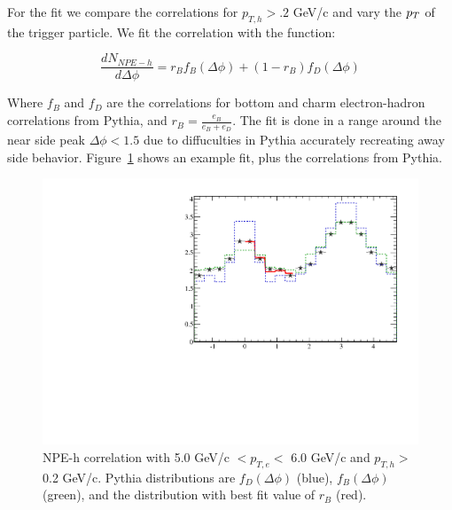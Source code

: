 For the fit we compare the correlations for $p_{T,h} > .2$ GeV/c and vary the $p_{T}$ of the trigger particle. We fit the correlation with the function:

\begin{equation}\label{eq:BDfitfunc}
\frac{dN_{NPE-h}}{d\Delta\phi} = r_B f_B(\Delta\phi) + (1 - r_B) f_D(\Delta\phi)
\end{equation}

Where $f_B$ and $f_D$ are the correlations for bottom and charm electron-hadron correlations from Pythia, and $r_B = \frac{e_B}{e_B + e_D}$. The fit is done in a range around the near side peak $\Delta\phi < 1.5$ due to diffuculties in Pythia accurately recreating away side behavior. Figure~\ref{fig:exfit} shows an example fit, plus the correlations from Pythia.

\begin{figure}[htbp]
\begin{center}
\includegraphics[scale=.8]{Plots/Correlations/charm_corr_primpt_5_5_assopt_0_9.pdf}
\end{center}
\caption[D/B Ratio Fit Example]{NPE-h correlation with 5.0 GeV/c $< p_{T,e} <$ 6.0 GeV/c and $p_{T,h} >$ 0.2 GeV/c. Pythia distributions are $f_D(\Delta\phi)$ (blue), $f_B(\Delta\phi)$ (green), and the distribution with best fit value of $r_B$ (red).}
\label{fig:exfit}
\end{figure}


